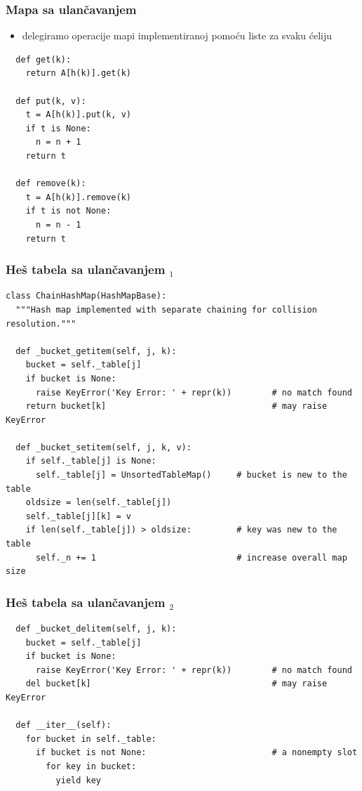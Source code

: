 \documentclass[compress]{beamer}
\begin{document}
\begin{frame}
  \frametitle{Mapa sa ulančavanjem}
  \begin{itemize}
    \item delegiramo operacije mapi implementiranoj pomoću liste za svaku ćeliju
  \end{itemize}
\begin{verbatim}
  def get(k):
    return A[h(k)].get(k)
  
  def put(k, v):
    t = A[h(k)].put(k, v)
    if t is None:
      n = n + 1
    return t
    
  def remove(k):
    t = A[h(k)].remove(k)
    if t is not None:
      n = n - 1
    return t
\end{verbatim}
\end{frame}

\begin{frame}[fragile,shrink=25]
  \frametitle{Heš tabela sa ulančavanjem $_1$}
\begin{verbatim}
class ChainHashMap(HashMapBase):
  """Hash map implemented with separate chaining for collision resolution."""

  def _bucket_getitem(self, j, k):
    bucket = self._table[j]
    if bucket is None:
      raise KeyError('Key Error: ' + repr(k))        # no match found
    return bucket[k]                                 # may raise KeyError

  def _bucket_setitem(self, j, k, v):
    if self._table[j] is None:
      self._table[j] = UnsortedTableMap()     # bucket is new to the table
    oldsize = len(self._table[j])
    self._table[j][k] = v
    if len(self._table[j]) > oldsize:         # key was new to the table
      self._n += 1                            # increase overall map size
\end{verbatim}
\end{frame}

\begin{frame}[fragile,shrink=25]
  \frametitle{Heš tabela sa ulančavanjem $_2$}
\begin{verbatim}
  def _bucket_delitem(self, j, k):
    bucket = self._table[j]
    if bucket is None:
      raise KeyError('Key Error: ' + repr(k))        # no match found
    del bucket[k]                                    # may raise KeyError

  def __iter__(self):
    for bucket in self._table:
      if bucket is not None:                         # a nonempty slot
        for key in bucket:
          yield key
\end{verbatim}
\end{frame}
\end{document}
